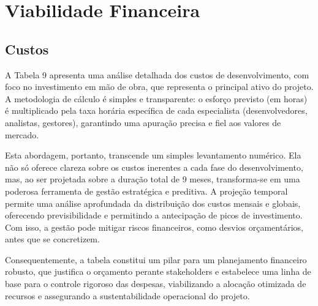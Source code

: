 \documentclass[
	12pt,				%
	openany,			%
	twoside,			%
	a4paper,			%
	english,			%
	brazil				%
	]{abntex2}
\begin{document}

\chapter{Viabilidade Financeira}

\section{Custos}

A Tabela 9 apresenta uma análise detalhada dos custos de desenvolvimento, com foco no investimento em mão de obra, que representa o principal ativo do projeto. A metodologia de cálculo é simples e transparente: o esforço previsto (em horas) é multiplicado pela taxa horária específica de cada especialista (desenvolvedores, analistas, gestores), garantindo uma apuração precisa e fiel aos valores de mercado.

Esta abordagem, portanto, transcende um simples levantamento numérico. Ela não só oferece clareza sobre os custos inerentes a cada fase do desenvolvimento, mas, ao ser projetada sobre a duração total de 9 meses, transforma-se em uma poderosa ferramenta de gestão estratégica e preditiva. A projeção temporal permite uma análise aprofundada da distribuição dos custos mensais e globais, oferecendo previsibilidade e permitindo a antecipação de picos de investimento. Com isso, a gestão pode mitigar riscos financeiros, como desvios orçamentários, antes que se concretizem.

Consequentemente, a tabela constitui um pilar para um planejamento financeiro robusto, que justifica o orçamento perante stakeholders e estabelece uma linha de base para o controle rigoroso das despesas, viabilizando a alocação otimizada de recursos e assegurando a sustentabilidade operacional do projeto.
\end{document}
